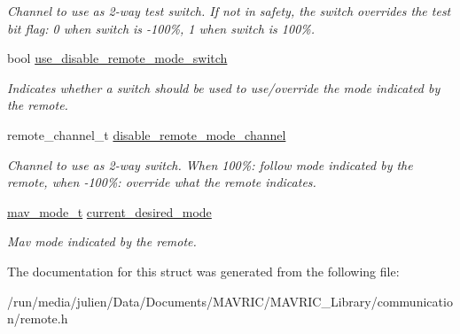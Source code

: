 \begin{DoxyCompactItemize}
\begin{DoxyCompactList}\small\item\em Channel to use as 2-\/way test switch. If not in safety, the switch overrides the test bit flag\+: 0 when switch is -\/100\%, 1 when switch is 100\%. \end{DoxyCompactList}\item 
\hypertarget{structremote__mode__t_aee65d5700181e1358cf10c88814c7add}{bool \hyperlink{structremote__mode__t_aee65d5700181e1358cf10c88814c7add}{use\+\_\+disable\+\_\+remote\+\_\+mode\+\_\+switch}}\label{structremote__mode__t_aee65d5700181e1358cf10c88814c7add}

\begin{DoxyCompactList}\small\item\em Indicates whether a switch should be used to use/override the mode indicated by the remote. \end{DoxyCompactList}\item 
\hypertarget{structremote__mode__t_a9b373af3b31c55674c45a3d3af9a3928}{remote\+\_\+channel\+\_\+t \hyperlink{structremote__mode__t_a9b373af3b31c55674c45a3d3af9a3928}{disable\+\_\+remote\+\_\+mode\+\_\+channel}}\label{structremote__mode__t_a9b373af3b31c55674c45a3d3af9a3928}

\begin{DoxyCompactList}\small\item\em Channel to use as 2-\/way switch. When 100\%\+: follow mode indicated by the remote, when -\/100\%\+: override what the remote indicates. \end{DoxyCompactList}\item 
\hypertarget{structremote__mode__t_a7d9aa978284193695181a10b85936b07}{\hyperlink{unionmav__mode__t}{mav\+\_\+mode\+\_\+t} \hyperlink{structremote__mode__t_a7d9aa978284193695181a10b85936b07}{current\+\_\+desired\+\_\+mode}}\label{structremote__mode__t_a7d9aa978284193695181a10b85936b07}

\begin{DoxyCompactList}\small\item\em Mav mode indicated by the remote. \end{DoxyCompactList}\end{DoxyCompactItemize}


The documentation for this struct was generated from the following file\+:\begin{DoxyCompactItemize}
\item 
/run/media/julien/\+Data/\+Documents/\+M\+A\+V\+R\+I\+C/\+M\+A\+V\+R\+I\+C\+\_\+\+Library/communication/remote.\+h\end{DoxyCompactItemize}
